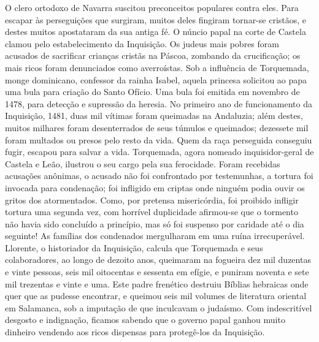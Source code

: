 \documentclass[11pt,a5paper,twoside,openany]{book}
\begin{document}
O clero ortodoxo de Navarra suscitou preconceitos populares contra eles. Para escapar às perseguições que surgiram, muitos deles fingiram tornar-se cristãos, e destes muitos apostataram da sua antiga fé. O núncio papal na corte de Castela clamou pelo estabelecimento da Inquisição. Os judeus mais pobres foram acusados ​​de sacrificar crianças cristãs na Páscoa, zombando da crucificação; os mais ricos foram denunciados como averroístas. Sob a influência de Torquemada, monge dominicano, confessor da rainha Isabel, aquela princesa solicitou ao papa uma bula para criação do Santo Ofício. Uma bula foi emitida em novembro de 1478, para detecção e supressão da heresia. No primeiro ano de funcionamento da Inquisição, 1481, duas mil vítimas foram queimadas na Andaluzia; além destes, muitos milhares foram desenterrados de seus túmulos e queimados; dezessete mil foram multados ou presos pelo resto da vida. Quem da raça perseguida conseguiu fugir, escapou para salvar a vida. Torquemada, agora nomeado inquisidor-geral de Castela e Leão, ilustrou o seu cargo pela sua ferocidade. Foram recebidas acusações anônimas, o acusado não foi confrontado por testemunhas, a tortura foi invocada para condenação; foi infligido em criptas onde ninguém podia ouvir os gritos dos atormentados. Como, por pretensa misericórdia, foi proibido infligir tortura uma segunda vez, com horrível duplicidade afirmou-se que o tormento não havia sido concluído a princípio, mas só foi suspenso por caridade até o dia seguinte! As famílias dos condenados mergulharam em uma ruína irrecuperável. Llorente, o historiador da Inquisição, calcula que Torquemada e seus colaboradores, ao longo de dezoito anos, queimaram na fogueira dez mil duzentas e vinte pessoas, seis mil oitocentas e sessenta em efígie, e puniram noventa e sete mil trezentas e vinte e uma. Este padre frenético destruiu Bíblias hebraicas onde quer que as pudesse encontrar, e queimou seis mil volumes de literatura oriental em Salamanca, sob a imputação de que inculcavam o judaísmo. Com indescritível desgosto e indignação, ficamos sabendo que o governo papal ganhou muito dinheiro vendendo aos ricos dispensas para protegê-los da Inquisição.
\end{document}
